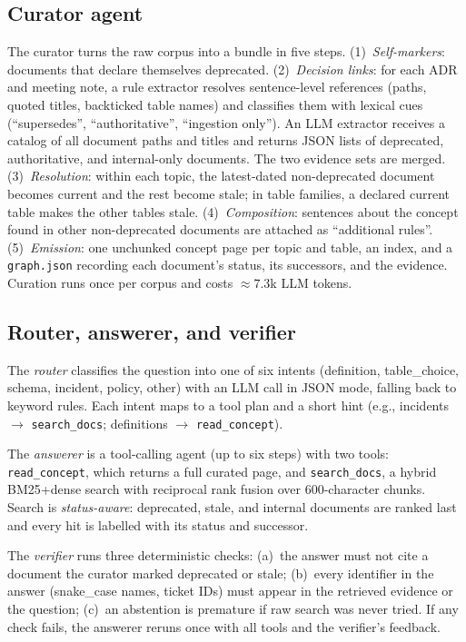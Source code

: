 \documentclass[conference]{IEEEtran}
\newcommand{\sys}[1]{\texttt{#1}}
\begin{document}
\subsection{Curator agent}
The curator turns the raw corpus into a bundle in five steps.
(1)~\emph{Self-markers}: documents that declare themselves deprecated.
(2)~\emph{Decision links}: for each ADR and meeting note, a rule extractor resolves sentence-level references
(paths, quoted titles, backticked table names) and classifies them with lexical cues (``supersedes'',
``authoritative'', ``ingestion only''). An LLM extractor receives a catalog of all document paths and titles and
returns JSON lists of deprecated, authoritative, and internal-only documents. The two evidence sets are merged.
(3)~\emph{Resolution}: within each topic, the latest-dated non-deprecated document becomes current and the rest
become stale; in table families, a declared current table makes the other tables stale.
(4)~\emph{Composition}: sentences about the concept found in other non-deprecated documents are attached as
``additional rules''.
(5)~\emph{Emission}: one unchunked concept page per topic and table, an index, and a \texttt{graph.json} recording
each document's status, its successors, and the evidence. Curation runs once per corpus and costs
${\approx}7.3$k LLM tokens.

\subsection{Router, answerer, and verifier}
The \emph{router} classifies the question into one of six intents (definition, table\_choice, schema, incident,
policy, other) with an LLM call in JSON mode, falling back to keyword rules. Each intent maps to a tool plan and
a short hint (e.g., incidents $\rightarrow$ \sys{search\_docs}; definitions $\rightarrow$ \sys{read\_concept}).

The \emph{answerer} is a tool-calling agent (up to six steps) with two tools: \sys{read\_concept}, which returns
a full curated page, and \sys{search\_docs}, a hybrid BM25+dense search with reciprocal rank fusion over
600-character chunks. Search is \emph{status-aware}: deprecated, stale, and internal documents are ranked last
and every hit is labelled with its status and successor.

The \emph{verifier} runs three deterministic checks: (a)~the answer must not cite a document the curator marked
deprecated or stale; (b)~every identifier in the answer (snake\_case names, ticket IDs) must appear in the
retrieved evidence or the question; (c)~an abstention is premature if raw search was never tried. If any check
fails, the answerer reruns once with all tools and the verifier's feedback.
\end{document}

